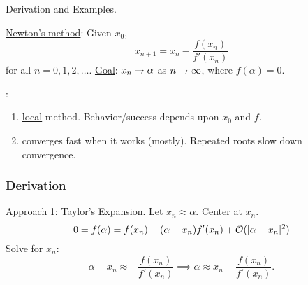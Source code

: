 \documentclass[]{article}
\begin{document}
Derivation and Examples. 

\ul{Newton's method}: Given $x_0$, $$ x_{n+1} = x_n - \frac{f(x_n)}{f'(x_n)} $$ for all $n=0,1,2,\dots$.
\ul{Goal}: $x_n\rightarrow\alpha$ as $n\rightarrow\infty$, where $f(\alpha)=0$.
\begin{note}:
	\begin{enumerate}
		\item \ul{local} method. Behavior/success depends upon $x_0$ and $f$.
		\item converges fast when it works (mostly). Repeated roots slow down convergence.
	\end{enumerate}
\end{note}
\subsubsection*{Derivation}

\ul{Approach 1}: Taylor's Expansion. Let $x_n\approx\alpha$. Center at $x_n$.
$$ 0 = f(\alpha) = f(x_n) + (\alpha-x_n)f'(x_n) + \mathcal{O}(|\alpha-x_n|^2) $$
Solve for $x_n$:
$$ \alpha - x_n \approx - \frac{f(x_n)}{f'(x_n)} \implies \alpha \approx x_n - \frac{f(x_n)}{f'(x_n)}. $$
\end{document}
